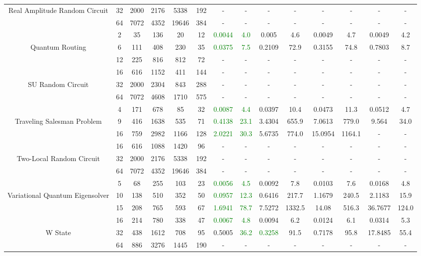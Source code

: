 \begin{table}[htb]
{\begin{tabular}{|c|c|c|c|c|c|c|c|c|c|c|c|c|c|}
Real Amplitude Random Circuit & 
32 & 2000 & 2176 & 5338 & 192
 & - & -
 & - & -
 & - & -
 & - & -
 \\
 & 
64 & 7072 & 4352 & 19646 & 384
 & - & -
 & - & -
 & - & -
 & - & -
 \\
\hline
 & 
2 & 35 & 136 & 20 & 12
 & \textcolor{green}{0.0044} & \textcolor{green}{4.0}
 & 0.005 & 4.6
 & 0.0049 & 4.7
 & 0.0049 & 4.2
 \\
Quantum Routing & 
6 & 111 & 408 & 230 & 35
 & \textcolor{green}{0.0375} & \textcolor{green}{7.5}
 & 0.2109 & 72.9
 & 0.3155 & 74.8
 & 0.7803 & 8.7
 \\
 & 
12 & 225 & 816 & 812 & 72
 & - & -
 & - & -
 & - & -
 & - & -
 \\
\hline
 & 
16 & 616 & 1152 & 411 & 144
 & - & -
 & - & -
 & - & -
 & - & -
 \\
SU Random Circuit & 
32 & 2000 & 2304 & 843 & 288
 & - & -
 & - & -
 & - & -
 & - & -
 \\
 & 
64 & 7072 & 4608 & 1710 & 575
 & - & -
 & - & -
 & - & -
 & - & -
 \\
\hline
 & 
4 & 171 & 678 & 85 & 32
 & \textcolor{green}{0.0087} & \textcolor{green}{4.4}
 & 0.0397 & 10.4
 & 0.0473 & 11.3
 & 0.0512 & 4.7
 \\
Traveling Salesman Problem & 
9 & 416 & 1638 & 535 & 71
 & \textcolor{green}{0.4138} & \textcolor{green}{23.1}
 & 3.4304 & 655.9
 & 7.0613 & 779.0
 & 9.564 & 34.0
 \\
 & 
16 & 759 & 2982 & 1166 & 128
 & \textcolor{green}{2.0221} & \textcolor{green}{30.3}
 & 5.6735 & 774.0
 & 15.0954 & 1164.1
 & - & -
 \\
\hline
 & 
16 & 616 & 1088 & 1420 & 96
 & - & -
 & - & -
 & - & -
 & - & -
 \\
Two-Local Random Circuit & 
32 & 2000 & 2176 & 5338 & 192
 & - & -
 & - & -
 & - & -
 & - & -
 \\
 & 
64 & 7072 & 4352 & 19646 & 384
 & - & -
 & - & -
 & - & -
 & - & -
 \\
\hline
 & 
5 & 68 & 255 & 103 & 23
 & \textcolor{green}{0.0056} & \textcolor{green}{4.5}
 & 0.0092 & 7.8
 & 0.0103 & 7.6
 & 0.0168 & 4.8
 \\
Variational Quantum Eigensolver & 
10 & 138 & 510 & 352 & 50
 & \textcolor{green}{0.0957} & \textcolor{green}{12.3}
 & 0.6416 & 217.7
 & 1.1679 & 240.5
 & 2.1183 & 15.9
 \\
 & 
15 & 208 & 765 & 593 & 67
 & \textcolor{green}{1.6941} & \textcolor{green}{78.7}
 & 7.5272 & 1332.5
 & 14.08 & 516.3
 & 36.7677 & 124.0
 \\
\hline
 & 
16 & 214 & 780 & 338 & 47
 & \textcolor{green}{0.0067} & \textcolor{green}{4.8}
 & 0.0094 & 6.2
 & 0.0124 & 6.1
 & 0.0314 & 5.3
 \\
W State & 
32 & 438 & 1612 & 708 & 95
 & 0.5005 & \textcolor{green}{36.2}
 & \textcolor{green}{0.3258} & 91.5
 & 0.7178 & 95.8
 & 17.8485 & 55.4
 \\
 & 
64 & 886 & 3276 & 1445 & 190
 & - & -
 & - & -
 & - & -
 & - & -
 \\
\hline
\end{tabular}}
\end{table}